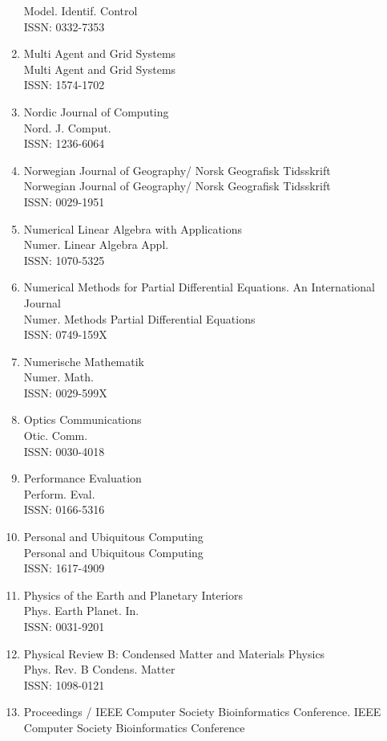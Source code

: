 \begin{enumerate}
 Model. Identif. Control\\
 ISSN: 0332-7353
\item
 Multi Agent and Grid Systems\\
 Multi Agent and Grid Systems\\
 ISSN: 1574-1702
\item
 Nordic Journal of Computing\\
 Nord. J. Comput.\\
 ISSN: 1236-6064
\item
 Norwegian Journal of Geography/ Norsk Geografisk Tidsskrift\\
 Norwegian Journal of Geography/ Norsk Geografisk Tidsskrift\\
 ISSN: 0029-1951
\item
 Numerical Linear Algebra with Applications\\
 Numer. Linear Algebra Appl.\\
 ISSN: 1070-5325
\item
 Numerical Methods for Partial Differential Equations. An International Journal\\
 Numer. Methods Partial Differential Equations\\
 ISSN: 0749-159X
\item
 Numerische Mathematik\\
 Numer. Math.\\
 ISSN: 0029-599X
\item
 Optics Communications\\
 Otic. Comm.\\
 ISSN: 0030-4018
\item
 Performance Evaluation\\
 Perform. Eval.\\
 ISSN: 0166-5316
\item
 Personal and Ubiquitous Computing\\
 Personal and Ubiquitous Computing\\
 ISSN: 1617-4909
\item
 Physics of the Earth and Planetary Interiors\\
 Phys. Earth Planet. In.\\
 ISSN: 0031-9201
\item
 Physical Review B: Condensed Matter and Materials Physics\\
 Phys. Rev. B Condens. Matter\\
 ISSN: 1098-0121
\item
 Proceedings / IEEE Computer Society Bioinformatics Conference. IEEE Computer Society Bioinformatics Conference\\

\end{enumerate}
